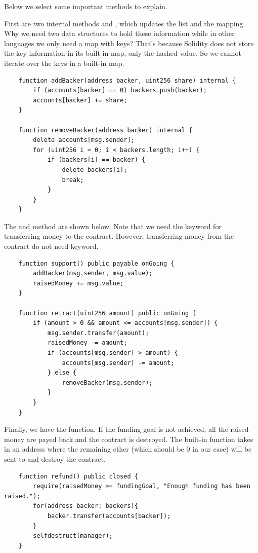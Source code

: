 \documentclass{article}
\begin{document}
Below we select some important methods to explain.

First are two internal methods  and , which updates the  list and the  mapping. Why we need two data structures to hold these information while in other languages we only need a map with keys? That's because Solidity does not store the key information in its built-in map, only the hashed value. So we cannot iterate over the keys in a built-in map.

\begin{lstlisting}
    function addBacker(address backer, uint256 share) internal {
        if (accounts[backer] == 0) backers.push(backer);
        accounts[backer] += share;
    }

    function removeBacker(address backer) internal {
        delete accounts[msg.sender];
        for (uint256 i = 0; i < backers.length; i++) {
            if (backers[i] == backer) {
                delete backers[i];
                break;
            }
        }
    }
\end{lstlisting}

The  and  method are shown below. Note that we need the  keyword for transferring money to the contract. However, transferring money from the contract do not need  keyword.
\begin{lstlisting}
    function support() public payable onGoing {
        addBacker(msg.sender, msg.value);
        raisedMoney += msg.value;
    }

    function retract(uint256 amount) public onGoing {
        if (amount > 0 && amount <= accounts[msg.sender]) {
            msg.sender.transfer(amount);
            raisedMoney -= amount;
            if (accounts[msg.sender] > amount) {
                accounts[msg.sender] -= amount;
            } else {
                removeBacker(msg.sender);
            }
        }
    }
\end{lstlisting}

Finally, we have the  function. If the funding goal is not achieved, all the raised money are payed back and the contract is destroyed. The built-in function  takes in an address where the remaining ether (which should be 0 in our case) will be sent to and destroy the contract.

\begin{lstlisting}
    function refund() public closed {
        require(raisedMoney >= fundingGoal, "Enough funding has been raised.");
        for(address backer: backers){
            backer.transfer(accounts[backer]);
        }
        selfdestruct(manager);
    }
\end{lstlisting}
\end{document}
